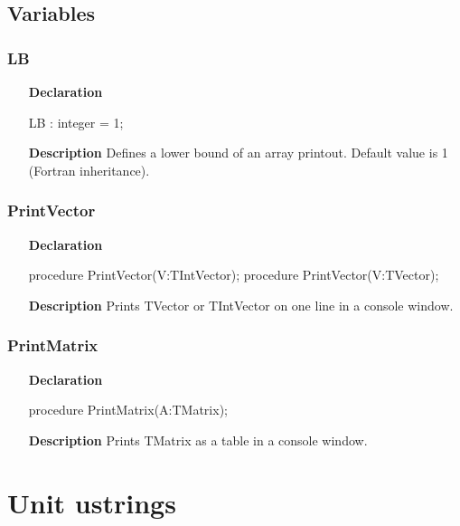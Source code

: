 \documentclass[12pt,a4paper,oneside]{report}
\newcommand{\declarationitem}[1]{\textbf{#1}}
\newcommand{\descriptiontitle}[1]{\textbf{#1}}
\begin{document}
\subsection{Variables}
\subsubsection{LB}
\label{uvecmatprn:LB}
\begin{itemize}
	\item[\declarationitem{Declaration}\hfill]
	\begin{flushleft}
LB : integer = 1;
	\end{flushleft}
	\item[\descriptiontitle{Description}\hfill]
	Defines a lower bound of an array printout. Default value is 1 (Fortran inheritance).
\end{itemize}
\subsubsection{PrintVector}
\label{uvecmatprn:PrintVector}
\begin{itemize}
	\item[\declarationitem{Declaration}\hfill]
	\begin{flushleft}
	procedure PrintVector(V:TIntVector);
	procedure PrintVector(V:TVector);
	\end{flushleft}
	\item[\descriptiontitle{Description}\hfill]
	Prints TVector or TIntVector on one line in a console window.
\end{itemize}
\subsubsection{PrintMatrix}
\label{uvecmatprn:PrintMatrix}
\begin{itemize}
	\item[\declarationitem{Declaration}\hfill]
	\begin{flushleft}
	procedure PrintMatrix(A:TMatrix);
	\end{flushleft}
	\item[\descriptiontitle{Description}\hfill]
	Prints TMatrix as a table in a console window.
\end{itemize}
\section{Unit ustrings}
\label{ustrings}
\end{document}
